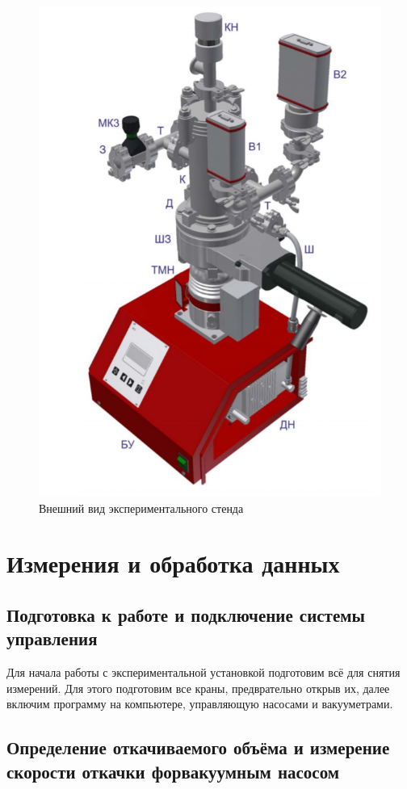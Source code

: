 \documentclass[a4paper, 12pt]{article} %
\begin{document}
\begin{figure}[h]
    \centering
    \includegraphics[width = 10.5 cm]{Внешний вид}
    \caption{Внешний вид экспериментального стенда}
    \label{fig:vac}
\end{figure}


\section{Измерения и обработка данных}
\subsection{Подготовка к работе и подключение системы управления}

Для начала работы с экспериментальной установкой подготовим всё для снятия измерений. Для этого подготовим все краны, предврательно открыв их, далее включим программу на компьютере, управляющую насосами и вакууметрами. 

\subsection{Определение откачиваемого объёма и измерение скорости откачки форвакуумным насосом}
\end{document}
